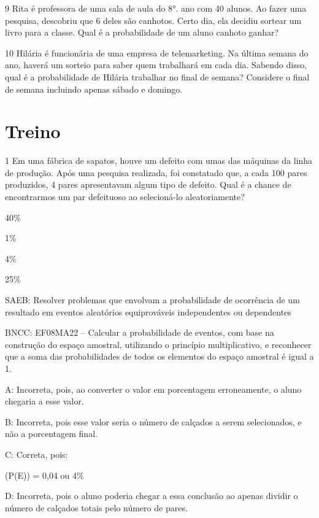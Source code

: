 {\num{9} Rita é professora de uma sala de aula do 8°. ano com 40 alunos. Ao
fazer uma pesquisa, descobriu que 6 deles são canhotos. Certo dia, ela
decidiu sortear um livro para a classe. Qual é a probabilidade de um
aluno canhoto ganhar?


\num{10} Hilária é funcionária de uma empresa de telemarketing. Na última
semana do ano, haverá um sorteio para saber quem trabalhará em cada dia.
Sabendo disso, qual é a probabilidade de Hilária trabalhar no final de
semana? Considere o final de semana incluindo apenas sábado e domingo.


\section{Treino}

\num{1} Em uma fábrica de sapatos, houve um defeito com umas das máquinas da
linha de produção. Após uma pesquisa realizada, foi constatado que, a
cada 100 pares produzidos, 4 pares apresentavam algum tipo de defeito.
Qual é a chance de encontrarmos um par defeituoso ao selecioná-lo
aleatoriamente?
\item 40\%
\item 1\%
\item 4\%
\item 25\%

SAEB: Resolver problemas que envolvam a probabilidade de ocorrência de
um resultado em eventos aleatórios equiprováveis independentes ou
dependentes

BNCC: EF08MA22 -- Calcular a probabilidade de eventos, com base na
construção do espaço amostral, utilizando o princípio multiplicativo, e
reconhecer que a soma das probabilidades de todos os elementos do espaço
amostral é igual a 1.

A: Incorreta, pois, ao converter o valor em porcentagem erroneamente, o
aluno chegaria a esse valor.

B: Incorreta, pois esse valor seria o número de calçados a serem
selecionados, e não a porcentagem final.

C: Correta, pois:

(P(E)) = 0,04 ou 4\%

D: Incorreta, pois o aluno poderia chegar a essa conclusão ao apenas
dividir o número de calçados totais pelo número de pares.

}
